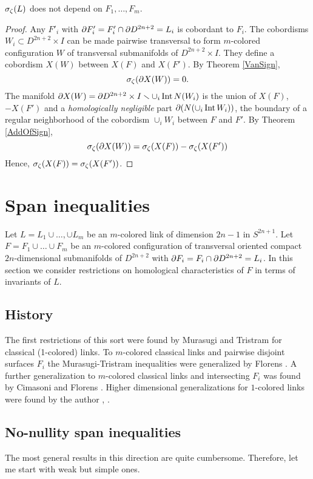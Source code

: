 \documentclass{article}
\numberwithin{equation}{section}
\begin{document}
\begin{Th}  $\sigma_{\zeta}(L)$ 
does not depend on $F_1,\dots,F_m$.
\end{Th}

\begin{proof} Any $F'_i$ with $\partial F'_i=F'_i\cap\partial
D^{2n+2}=L_i$ is cobordant to $F_i$.
The cobordisms $W_i\subset D^{2n+2}\times I$ can be made 
pairwise transversal to form $m$-colored configuration $W$ of 
transversal submanifolds of $D^{2n+2}\times I$.
They define a cobordism $X(W)$
between $X(F)$ and
$X(F')$.
By Theorem \ref{VanSign},  
$$\sigma_\zeta(\partial X(W))=0.$$
The manifold $\partial X(W)=\partial D^{2n+2}\times I\smallsetminus\cup_i\operatorname{Int} N(W_i)$ 
is the union of
$X(F)$, $-X(F')$ and a {\it
homologically negligible\/} part 
$\partial (N(\cup_i\operatorname{Int} W_i))$, 
the boundary of a regular neighborhood
of the cobordism $\cup_iW_i$ between $F$ and $F'$.
By Theorem \ref{AddOfSign}, 
$$\sigma_\zeta(\partial X(W))=\sigma_\zeta(X(F))-\sigma_\zeta(X(F'))$$
Hence, 
$\sigma_\zeta(X(F))=\sigma_\zeta(X(F'))$.
\end{proof}

\section{Span inequalities}\label{s4} 
Let $L=L_1\cup\dots,\cup L_m$ be an $m$-colored link of dimension $2n-1$ 
in $S^{2n+1}$. Let $F=F_1\cup\dots\cup F_m$ be an $m$-colored 
configuration of transversal oriented compact $2n$-dimensional 
submanifolds of $D^{2n+2}$ with $\partial F_i=F_i\cap\partial D^{2n+2}=L_i$. 
In this section we consider restrictions on homological
characteristics of $F$ in terms of invariants of $L$.

\subsection{History}\label{s4.1}
The first restrictions of this sort were found by Murasugi \cite{Mura1} 
and Tristram \cite{Trist} for classical (1-colored) links. To $m$-colored
classical links and pairwise disjoint surfaces $F_i$ the Murasugi-Tristram
inequalities were generalized by Florens \cite{Florens1}. A further
generalization to $m$-colored classical links and intersecting $F_i$
was found by Cimasoni and Florens \cite{CimaFlor}. Higher dimensional
generalizations for $1$-colored links were found by the author
\cite{Viro2}, \cite{Viro3}.

\subsection{No-nullity span inequalities}\label{s4.2}
The most general results in this direction are quite cumbersome. 
Therefore, let me start with weak but simple ones.
\end{document}
